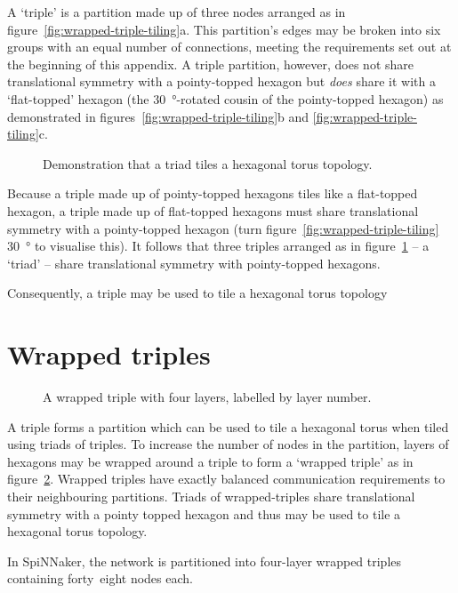 		A `triple' is a partition made up of three nodes arranged as in
		figure~\ref{fig:wrapped-triple-tiling}a. This partition's edges may be
		broken into six groups with an equal number of connections, meeting the
		requirements set out at the beginning of this appendix. A triple partition,
		however, does not share translational symmetry with a pointy-topped hexagon
		but \emph{does} share it with a `flat-topped' hexagon (the
		\SI{30}{\degree}-rotated cousin of the pointy-topped hexagon) as
		demonstrated in figures~\ref{fig:wrapped-triple-tiling}b and
		\ref{fig:wrapped-triple-tiling}c.
		
		\begin{figure}
			\center
			
			\caption[Triads tile a hexagonal torus topology.]%
			{Demonstration that a triad tiles a hexagonal torus topology.}
			\label{fig:triad-tiling}
		\end{figure}
		
		Because a triple made up of pointy-topped hexagons tiles like a flat-topped
		hexagon, a triple made up of flat-topped hexagons must share translational
		symmetry with a pointy-topped hexagon (turn
		figure~\ref{fig:wrapped-triple-tiling} \SI{30}{\degree} to visualise this).
		It follows that three triples arranged as in figure~\ref{fig:triad-tiling}
		-- a `triad' -- share translational symmetry with pointy-topped hexagons.
		
		Consequently, a triple may be used to tile a hexagonal torus topology 
	
	\section{Wrapped triples}
		
		\begin{figure}
			\center
			
			\caption{A wrapped triple with four layers, labelled by layer number.}
			\label{fig:wrapped-triple}
		\end{figure}
		
		A triple forms a partition which can be used to tile a hexagonal torus when
		tiled using triads of triples. To increase the number of nodes in the
		partition, layers of hexagons may be wrapped around a triple to form a
		`wrapped triple' as in figure~\ref{fig:wrapped-triple}. Wrapped triples
		have exactly balanced communication requirements to their neighbouring
		partitions.  Triads of wrapped-triples share translational symmetry with a
		pointy topped hexagon and thus may be used to tile a hexagonal torus
		topology.
		
		In SpiNNaker, the network is partitioned into four-layer wrapped triples
		containing forty~eight nodes each.
